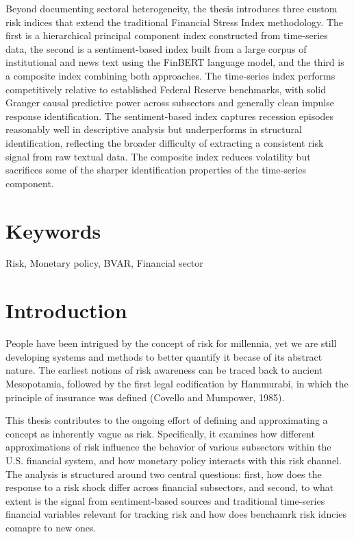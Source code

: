 \documentclass[12pt,a4paper]{report}\usepackage[a4paper, top=2.5cm, bottom=2.5cm, left=2.5cm, right=2.5cm]{geometry}
\begin{document}
Beyond documenting sectoral heterogeneity, the thesis introduces three custom risk indices that extend the traditional Financial Stress Index methodology. The first is a hierarchical principal component index constructed from time-series data, the second is a sentiment-based index built from a large corpus of institutional and news text using the FinBERT language model, and the third is a composite index combining both approaches. The time-series index performs competitively relative to established Federal Reserve benchmarks, with solid Granger causal predictive power across subsectors and generally clean impulse response identification. The sentiment-based index captures recession episodes reasonably well in descriptive analysis but underperforms in structural identification, reflecting the broader difficulty of extracting a consistent risk signal from raw textual data. The composite index reduces volatility but sacrifices some of the sharper identification properties of the time-series component. 
\chapter*{Keywords}
Risk, Monetary policy, BVAR, Financial sector

\tableofcontents
\newpage

\chapter*{Introduction}

People have been intrigued by the concept of risk for millennia, yet we are still 
developing systems and methods to better quantify it becase of its abstract nature. The earliest notions of risk 
awareness can be traced back to ancient Mesopotamia, followed by the first legal 
codification by Hammurabi, in which the principle of insurance was defined 
(Covello and Mumpower, 1985).

This thesis contributes to the ongoing effort of defining and approximating a concept as inherently vague as risk. Specifically, it examines how different approximations of risk influence the behavior of various subsectors within the U.S. financial system, and how monetary policy interacts with this risk channel. The analysis is structured around two central questions: first, how does the response to a risk shock differ across financial subsectors, and second, to what extent is the signal from sentiment-based sources and traditional time-series financial variables relevant for tracking risk and how does benchamrk risk idncies comapre to new ones.  
\end{document}

